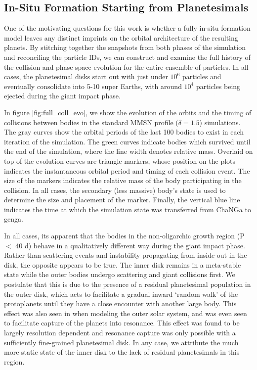 \subsection{In-Situ Formation Starting from Planetesimals}

One of the motivating questions for this work is whether a fully in-situ formation model leaves any distinct imprints on the orbital architecture of the resulting planets. By stitching together the snapshots from both phases of the simulation and reconciling the particle IDs, we can construct and examine the full history of the collision and phase space evolution for the entire ensemble of particles. In all cases, the planetesimal disks start out with just under $10^{6}$ particles and eventually consolidate into 5-10 super Earths, with around $10^{4}$ particles being ejected during the giant impact phase.

In figure \ref{fig:full_coll_evo}, we show the evolution of the orbits and the timing of collisions between bodies in the standard MMSN profile ($\delta = 1.5$) simulations. The gray curves show the orbital periods of the last 100 bodies to exist in each iteration of the simulation. The green curves indicate bodies which survived until the end of the simulation, where the line width denotes relative mass. Overlaid on top of the evolution curves are triangle markers, whose position on the plots indicates the instantaneous orbital period and timing of each collision event. The size of the markers indicates the relative mass of the body participating in the collision. In all cases, the secondary (less massive) body's state is used to determine the size and placement of the marker. Finally, the vertical blue line indicates the time at which the simulation state was transferred from {\sc ChaNGa} to {\sc genga}.

In all cases, its apparent that the bodies in the non-oligarchic growth region (P $<$ 40 d) behave in a qualitatively different way during the giant impact phase. Rather than scattering events and instability propagating from inside-out in the disk, the opposite appears to be true. The inner disk remains in a meta-stable state while the outer bodies undergo scattering and giant collisions first. We postulate that this is due to the presence of a residual planetesimal population in the outer disk, which acts to facilitate a gradual inward `random walk' of the protoplanets until they have a close encounter with another large body. This effect was also seen in \cite{murrayclay06} when modeling the outer solar system, and was even seen to facilitate capture of the planets into resonance. This effect was found to be largely resolution dependent and resonance capture was only possible with a sufficiently fine-grained planetesimal disk. In any case, we attribute the much more static state of the inner disk to the lack of residual planetesimals in this region.

